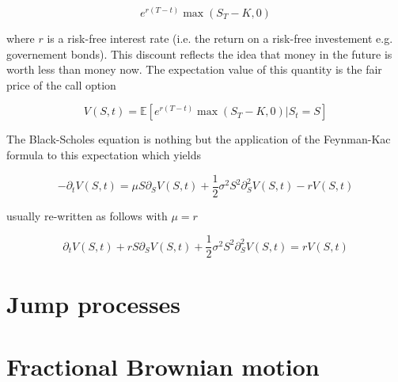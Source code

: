 \documentclass[11pt,a4paper]{article}
\begin{document}
\begin{equation}
    e^{r(T-t)}\max(S_T-K,0)
\end{equation}

where $r$ is a risk-free interest rate (i.e. the return on a risk-free investement e.g. governement bonds). This discount reflects the idea that money in the future is worth less than money now.
The expectation value of this quantity is the fair price of the call option

\begin{equation}
    V(S,t) = \mathbb{E}[e^{r(T-t)}\max(S_T-K,0)|S_t = S]
\end{equation}


The Black-Scholes equation is nothing but the application of the Feynman-Kac formula to this expectation which yields

\begin{equation}
-\partial_tV(S,t) = \mu S \partial_SV(S,t)+ \frac{1}{2}\sigma^2S^2\partial^2_SV(S,t)- rV(S,t)  
\end{equation}

usually re-written as follows with $\mu = r$

\begin{equation}
    \partial_tV(S,t) +r S \partial_SV(S,t)+ \frac{1}{2}\sigma^2S^2\partial^2_SV(S,t)= rV(S,t)  
    \end{equation}


\section{Jump processes}

\section{Fractional Brownian motion}
\end{document}
